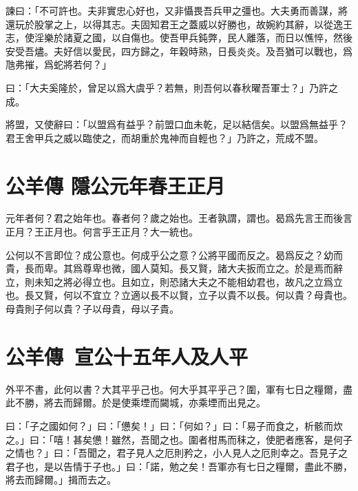 諫曰：「不可許也。夫非實忠心好也，又非懾畏吾兵甲之彊也。大夫勇而善謀，將還玩於股掌之上，以得其志。夫固知君王之蓋威以好勝也，故婉約其辭，以從逸王志，使淫樂於諸夏之國，以自傷也。使吾甲兵鈍弊，民人離落，而日以憔悴，然後安受吾燼。夫好信以愛民，四方歸之，年穀時熟，日長炎炎。及吾猶可以戰也，爲虺弗摧，爲蛇將若何？」

曰：「大夫奚隆於，曾足以爲大虞乎？若無，則吾何以春秋曜吾軍士？」乃許之成。

將盟，又使辭曰：「以盟爲有益乎？前盟口血未乾，足以結信矣。以盟爲無益乎？君王舍甲兵之威以臨使之，而胡重於鬼神而自輕也？」乃許之，荒成不盟。

\section[春王正月\quad{\small 公羊傳 隱公元年}]{{\normalsize 公羊傳 隱公元年}\quad 春王正月}
元年者何？君之始年也。春者何？歲之始也。王者孰謂，謂也。曷爲先言王而後言正月？王正月也。何言乎王正月？大一統也。

公何以不言即位？成公意也。何成乎公之意？公將平國而反之。曷爲反之？幼而貴，長而卑。其爲尊卑也微，國人莫知。長又賢，諸大夫扳而立之。於是焉而辭立，則未知之將必得立也。且如立，則恐諸大夫之不能相幼君也，故凡之立爲立也。長又賢，何以不宜立？立適以長不以賢，立子以貴不以長。何以貴？母貴也。母貴則子何以貴？子以母貴，母以子貴。

\section[宋人及楚人平\quad{\small 公羊傳 宣公十五年}]{{\normalsize 公羊傳\ 宣公十五年}\quad {}人及人平}
外平不書，此何以書？大其平乎己也。何大乎其平乎己？圍，軍有七日之糧爾，盡此不勝，將去而歸爾。於是使乘堙而闚城，亦乘堙而出見之。

曰：「子之國如何？」曰：「憊矣！」曰：「何如？」曰：「易子而食之，析骸而炊之。」曰：「嘻！甚矣憊！雖然，吾聞之也。圍者柑馬而秣之，使肥者應客，是何子之情也？」曰：「吾聞之，君子見人之厄則矜之，小人見人之厄則幸之。吾見子之君子也，是以告情于子也。」曰：「諾，勉之矣！吾軍亦有七日之糧爾，盡此不勝，將去而歸爾。」揖而去之。

